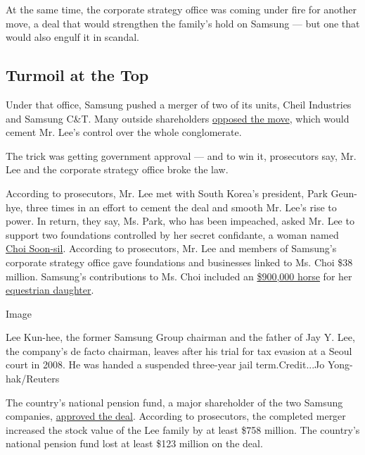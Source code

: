 At the same time, the corporate strategy office was coming under fire
for another move, a deal that would strengthen the family's hold on
Samsung --- but one that would also engulf it in scandal.

\hypertarget{turmoil-at-the-top}{%
\subsection{Turmoil at the Top}\label{turmoil-at-the-top}}

Under that office, Samsung pushed a merger of two of its units, Cheil
Industries and Samsung C\&T. Many outside shareholders
\href{https://www.nytimes.com/2015/06/05/business/dealbook/an-activist-investor-takes-aim-at-bid-for-samsung.html}{opposed
the move}, which would cement Mr. Lee's control over the whole
conglomerate.

The trick was getting government approval --- and to win it, prosecutors
say, Mr. Lee and the corporate strategy office broke the law.

According to prosecutors, Mr. Lee met with South Korea's president, Park
Geun-hye, three times in an effort to cement the deal and smooth Mr.
Lee's rise to power. In return, they say, Ms. Park, who has been
impeached, asked Mr. Lee to support two foundations controlled by her
secret confidante, a woman named
\href{https://www.nytimes.com/2016/10/28/world/asia/south-korea-choi-soon-sil.html}{Choi
Soon-sil}. According to prosecutors, Mr. Lee and members of Samsung's
corporate strategy office gave foundations and businesses linked to Ms.
Choi \$38 million. Samsung's contributions to Ms. Choi included an
\href{https://www.washingtonpost.com/world/samsung-scion-to-be-indicted-on-bribery-charges/2017/02/28/b5988fca-863c-4ca7-8b7d-9e105549d9a9_story.html?utm_term=.7eb096d19257}{\$900,000
horse} for her
\href{https://www.nytimes.com/2017/01/02/world/asia/south-korea-scandal-choi-soon-sil-daughter.html}{equestrian
daughter}.

Image

Lee Kun-hee, the former Samsung Group chairman and the father of Jay Y.
Lee, the company's de facto chairman, leaves after his trial for tax
evasion at a Seoul court in 2008. He was handed a suspended three-year
jail term.Credit...Jo Yong-hak/Reuters

The country's national pension fund, a major shareholder of the two
Samsung companies,
\href{https://www.nytimes.com/2016/12/31/world/asia/south-korea-samsung-merger-moon-hyung-pyo.html}{approved
the deal}. According to prosecutors, the completed merger increased the
stock value of the Lee family by at least \$758 million. The country's
national pension fund lost at least \$123 million on the deal.

